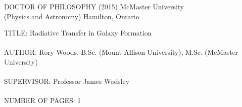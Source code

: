 





\pagestyle{empty}
\vspace*{0.5in}

\noindent 
DOCTOR OF PHILOSOPHY (2015) \hspace{2.0cm} McMaster University \\
(Physics and Astronomy)     \hspace{4.2cm} Hamilton, Ontario 
\vspace{0.5in}

\noindent
TITLE: Radiative Transfer in Galaxy Formation \\ \\
AUTHOR: Rory Woods, B.Sc. (Mount Allison University), M.Sc. (McMaster University)\\ \\
SUPERVISOR: Professor James Wadsley\\ \\
NUMBER OF PAGES: 1


